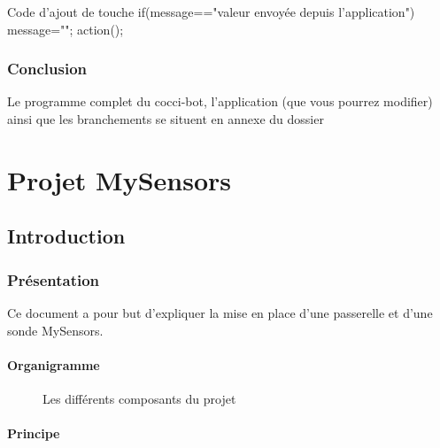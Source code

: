 \begin{Cpp}{Code d'ajout de touche}
if(message=="valeur envoyée depuis l'application")   {message="";             
                           action();}
\end{Cpp}

\section{Conclusion}
Le programme complet du cocci-bot, l'application (que vous pourrez modifier) ainsi que les branchements se situent en annexe du dossier%
\part{Projet MySensors}

\chapter{Introduction}

\section{Présentation}

Ce document a pour but d'expliquer la mise en place d'une passerelle et d'une sonde MySensors.

\subsection{Organigramme}

\begin{figure}[h]
  \centering
{} 
\caption{Les différents composants du projet}
\end{figure}

  \subsection{Principe}

